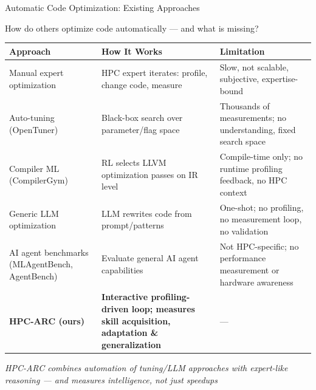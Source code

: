 \documentclass[compress,aspectratio=169]{beamer}
\begin{document}
\begin{frame}{Automatic Code Optimization: Existing Approaches}

    \vspace{-0.2em}
    \scriptsize
    How do others optimize code automatically --- and what is missing?
    \vspace{0.2em}

    \begin{table}
        \centering
        \tiny
        \begin{tabular}{@{}p{3.0cm}p{5.4cm}p{5.0cm}@{}}
            \toprule
            \textbf{Approach} & \textbf{How It Works} & \textbf{Limitation} \\
            \midrule
            Manual expert optimization & HPC expert iterates: profile, change code, measure & Slow, not scalable, subjective, expertise-bound \\
            \addlinespace
            Auto-tuning (OpenTuner) & Black-box search over parameter/flag space & Thousands of measurements; no understanding, fixed search space \\
            \addlinespace
            Compiler ML (CompilerGym) & RL selects LLVM optimization passes on IR level & Compile-time only; no runtime profiling feedback, no HPC context \\
            \addlinespace
            Generic LLM optimization & LLM rewrites code from prompt/patterns & One-shot; no profiling, no measurement loop, no validation \\
            \addlinespace
            AI agent benchmarks (MLAgentBench, AgentBench) & Evaluate general AI agent capabilities & Not HPC-specific; no performance measurement or hardware awareness \\
            \midrule
            \textbf{HPC-ARC (ours)} & \textbf{Interactive profiling-driven loop; measures skill acquisition, adaptation \& generalization} & --- \\
            \bottomrule
        \end{tabular}
    \end{table}

    \vspace{0.2em}
    \centering
    \scriptsize \textit{HPC-ARC combines automation of tuning/LLM approaches with expert-like reasoning --- and measures \emph{intelligence}, not just speedups}
\end{frame}
\end{document}

